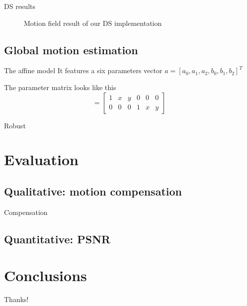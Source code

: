 \documentclass[aspectratio=1610,xcolor=dvipsnames]{beamer}
\begin{document}
\begin{frame}{DS results}
\begin{figure}[H]
\begin{minipage}[b]{0.45\textwidth}
            \label{fig:bbme-3-res}
		\end{minipage}
        \label{fig:bbme-3}
        \caption{Motion field result of our DS implementation}
	\end{figure}
\end{frame}

\subsection{Global motion estimation}
\begin{frame}{The affine model}
    It features a six parameters vector \(a = [a_0, a_1, a_2, b_0, b_1, b_2]^T\)
    \bigskip

    The parameter matrix looks like this 
    \begin{equation*}
        [A(x)] = 
        \begin{bmatrix}
            1 & x & y & 0 & 0 & 0 \\
            0 & 0 & 0 & 1 & x & y
        \end{bmatrix}
    \end{equation*}
\end{frame}

\begin{frame}{Robust}
    
\end{frame}


\section{Evaluation}
\subsection{Qualitative: motion compensation}
\begin{frame}{Compensation}

\end{frame}
\subsection{Quantitative: PSNR}

\section{Conclusions}

\begin{frame}
    \begin{center}
        {\Huge\calligra Thanks!}
    \end{center}
\end{frame}
\end{document}
